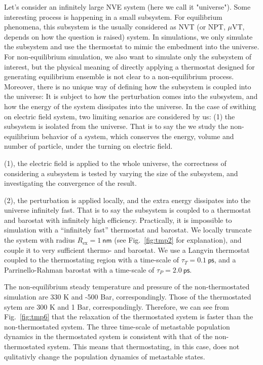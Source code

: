 \documentclass[a4paper,preprint,onecolumn]{revtex4-1}
\begin{document}


Let's consider an infinitely large NVE system (here we call it
"universe"). Some interesting process is happening in a small
subsystem. For equilibrium phenomena, this subsystem is the usually
considered as NVT (or NPT, $\mu$VT, depends on how the question is
raised) system.  In simulations, we only simulate the subsystem and
use the thermostat to mimic the embedment into the universe.  For
non-equilibrium simulation, we also want to simulate only the
subsystem of interest, but the physical meaning of directly applying a
thermostat designed for generating equilibrium ensemble is not clear
to a non-equilibrium process. Moreover, there is no unique way of
defining how the subsystem is coupled into the universe: It is subject
to how the perturbation comes into the subsystem, and how the energy
of the system dissipates into the universe. In the case of swithing on
electric field system, two limiting senarios are considered by us: (1)
the subsystem is isolated from the universe. That is to say the we
study the non-equilibrium behavior of a system, which conserves the
energy, volume and number of particle, under the turning on electric
field.

(1), the
electric field is applied to the whole universe, the correctness of
considering a subsystem is tested by varying the size of the
subsystem, and investigating the convergence of the result.

(2), the
perturbation is applied locally, and the extra energy dissipates into
the universe infinitely fast. That is to say the subsystem is coupled
to a thermostat and barostat with infinitely high
efficiency. Practically, it is impossible to simulation with a
``infinitely fast'' thermostat and barostat. We locally truncate the
system with radius $R_{\textrm{ex}} = 1~\textsf{nm}$ (see
Fig.~\ref{fig:tmp2} for explanation), and couple it to very sufficient
thermo- and barostat. We use a Langvin thermostat coupled to the
thermostating region with a time-scale of $\tau_{T} =
0.1~\textsf{ps}$, and a Parrinello-Rahman barostat with a time-scale
of $\tau_{P} = 2.0~\textsf{ps}$.

The non-equilibrium steady temperature and pressure of the
non-thermostated simulation are $330$ K and -500 Bar,
correspondingly. Those of the thermostated sytem are $300$ K and 1
Bar, correspondingly. Therefore, we can see from Fig.~\ref{fig:tmp6}
that the relaxation of the thermostated system is faster than the
non-thermostated system. The three time-scale of metastable population
dynamics in the thermostated system is consistent with that of the
non-thermostated system. This means that thermostating, in this case,
does not qulitativly change the population dynamics of metastable
states.
\end{document}
